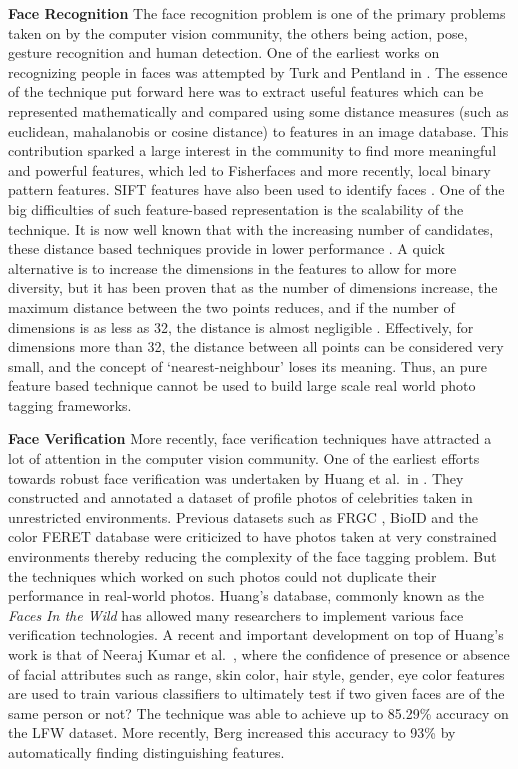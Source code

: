 \textbf{Face Recognition}
The face recognition problem is one of the primary problems taken on by the computer vision community, the others being action, pose, gesture recognition and human detection. One of the earliest works on recognizing people in faces was attempted by Turk and Pentland in \cite{turk1991eigenfaces}. The essence of the technique put forward here was to extract useful features which can be represented mathematically and compared using some distance measures (such as euclidean, mahalanobis or cosine distance) to features in an image database. This contribution sparked a large interest in the community to find more meaningful and powerful features, which led to Fisherfaces \cite{belhumeur1997eigenfaces} and more recently, local binary pattern \cite{ahonen2006face} features. SIFT features have also been used to identify faces \cite{bicego2006use, geng2009sift, luo2007person}. One of the big difficulties of such feature-based representation is the scalability of the technique. It is now well known that with the increasing number of candidates, these distance based techniques provide in lower performance \cite{wu2004probability}. A quick alternative is to increase the dimensions in the features to allow for more diversity, but it has been proven that as the number of dimensions increase, the maximum distance between the two points reduces, and if the number of dimensions is as less as 32, the distance is almost negligible \cite{beyer1999nearest}. Effectively, for dimensions more than 32, the distance between all points can be considered very small, and the concept of `nearest-neighbour' loses its meaning. Thus, an pure feature based technique cannot be used to build large scale real world photo tagging frameworks.

\textbf{Face Verification}
More recently, face verification techniques have attracted a lot of attention in the computer vision community. One of the earliest efforts towards robust face verification was undertaken by Huang et al.\ in \cite{huang2007labeled}. They constructed and annotated a dataset of profile photos of celebrities taken in unrestricted environments. Previous datasets such as FRGC \cite{phillips2005overview}, BioID \cite{jesorsky2001robust} and the color FERET database \cite{phillips1998feret} were criticized to have photos taken at very constrained environments thereby reducing the complexity of the face tagging problem. But the techniques which worked on such photos could not duplicate their performance in real-world photos. Huang's database, commonly known as the \textit{Faces In the Wild} has allowed many researchers to implement various face verification technologies. A recent and important development on top of Huang's work is that of Neeraj Kumar et al.\ \cite{nk_attribute_classifiers}, where the confidence of presence or absence of facial attributes such as range, skin color, hair style, gender, eye color features are used to train various classifiers to ultimately test if two given faces are of the same person or not? The technique was able to achieve up to 85.29\% accuracy on the LFW dataset. More recently, Berg \cite{berg2012tom} increased this accuracy to 93\% by automatically finding distinguishing features.

